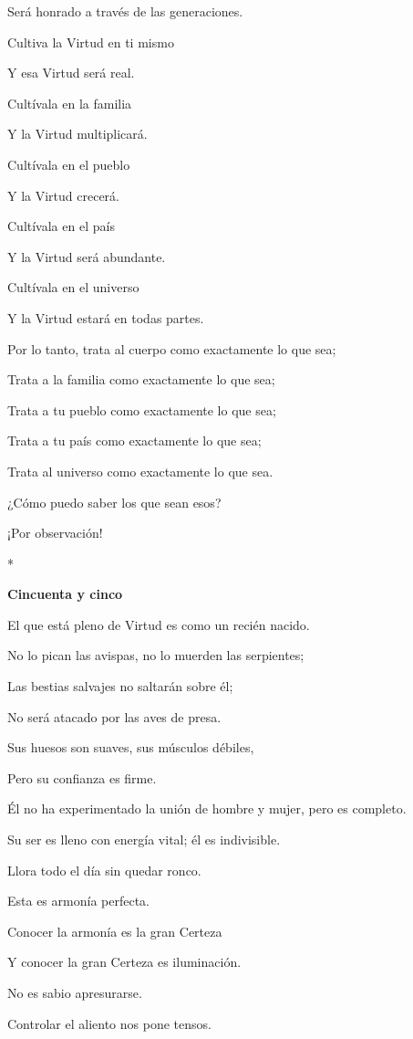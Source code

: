 Será honrado a través de las generaciones.

Cultiva la Virtud en ti mismo

Y esa Virtud será real.

Cultívala en la familia

Y la Virtud multiplicará.

Cultívala en el pueblo

Y la Virtud crecerá.

Cultívala en el país

Y la Virtud será abundante.

Cultívala en el universo

Y la Virtud estará en todas partes.

Por lo tanto, trata al cuerpo como exactamente lo que sea;

Trata a la familia como exactamente lo que sea;

Trata a tu pueblo como exactamente lo que sea;

Trata a tu país como exactamente lo que sea;

Trata al universo como exactamente lo que sea.

¿Cómo puedo saber los que sean esos?

¡Por observación!

*

\textbf{Cincuenta y cinco}

El que está pleno de Virtud es como un recién nacido.

No lo pican las avispas, no lo muerden las serpientes;

Las bestias salvajes no saltarán sobre él;

No será atacado por las aves de presa.

Sus huesos son suaves, sus músculos débiles,

Pero su confianza es firme.

Él no ha experimentado la unión de hombre y mujer, pero es completo.

Su ser es lleno con energía vital; él es indivisible.

Llora todo el día sin quedar ronco.

Esta es armonía perfecta.

Conocer la armonía es la gran Certeza

Y conocer la gran Certeza es iluminación.

No es sabio apresurarse.

Controlar el aliento nos pone tensos.

